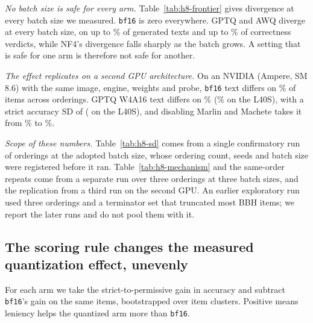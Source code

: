 \documentclass[conference]{IEEEtran}
\begin{document}
\emph{No batch size is safe for every arm.} Table~\ref{tab:h8-frontier} gives divergence at
every batch size we measured. \texttt{bf16} is zero everywhere. GPTQ and AWQ diverge at every
batch size, on up to \hEightWorstText\% of generated texts and up to \hEightWorstCorr\% of
correctness verdicts, while NF4's divergence falls sharply as the batch grows. A setting that
is safe for one arm is therefore not safe for another.

\emph{The effect replicates on a second GPU architecture.} On an NVIDIA \hEightSpotGPU{}
(Ampere, SM 8.6) with the same image, engine, weights and probe, \texttt{bf16} text differs on
\hEightSpotBFText\% of items across \hEightSpotOrderings{} orderings. GPTQ W4A16 text differs
on \hEightSpotText\% (\hEightTenText\% on the L40S), with a strict accuracy SD of
\hEightSpotSD{} (\hEightTenSD{} on the L40S), and disabling Marlin and Machete takes it from
\hEightSpotMarlinOn\% to \hEightSpotMarlinOff\%.

\emph{Scope of these numbers.} Table~\ref{tab:h8-sd} comes from a single confirmatory run
of \hEightSDOrderings{} orderings at the adopted batch size, whose ordering count, seeds and
batch size were registered before it ran. Table~\ref{tab:h8-mechanism} and the same-order
repeats come from a separate run over three orderings at three batch sizes, and the replication
from a third run on the second GPU. An earlier exploratory run used three orderings and a
terminator set that truncated most BBH items; we report the later runs and do not pool them
with it.

\subsection{The scoring rule changes the measured quantization effect, unevenly}
\label{sec:h3}

For each arm we take the strict-to-permissive gain in accuracy and subtract \texttt{bf16}'s
gain on the same items, bootstrapped over item clusters. Positive means leniency helps the
quantized arm more than \texttt{bf16}.

\begin{table}[t]
\centering
\caption{Precision $\times$ scoring interaction in accuracy points against \texttt{bf16}, on
\hThreeRecords{} generations. \textbf{Bold} excludes the null. $\dagger$: ARC-C is exactly
zero, so the interval is the Wilson zero-event bound.}
\label{tab:h3-interaction}
\small

\end{table}
\end{document}
